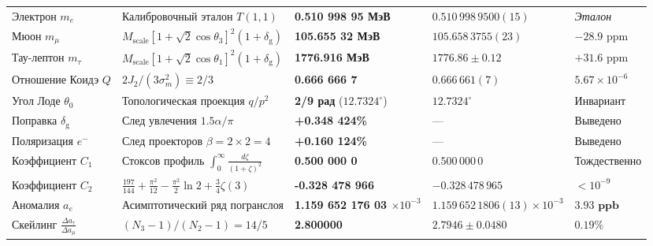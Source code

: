 \documentclass[11pt,a4paper]{article}
\theoremstyle{definition}
\theoremstyle{remark}
\begin{document}
\begin{xltabular}{\textwidth}{>{\raggedright\arraybackslash}p{3.2cm} X >{\centering\arraybackslash}p{2.7cm} >{\centering\arraybackslash}p{3.0cm} >{\raggedleft\arraybackslash}p{2.1cm}}
 \\
\midrule
Электрон $m_e$ & Калибровочный эталон $T(1,1)$ & \textbf{0.510 998 95 МэВ} & $0.510\,998\,9500(15)$ & \textit{Эталон} \\
Мюон $m_\mu$ & $M_{\mathrm{scale}} [1+\sqrt{2}\cos\theta_3]^2 (1+\delta_{\mathrm{g}})$ & \textbf{105.655 32 МэВ} & $105.658\,3755(23)$ & $-28.9\text{ ppm}$ \\
Тау-лептон $m_\tau$ & $M_{\mathrm{scale}} [1+\sqrt{2}\cos\theta_1]^2 (1+\delta_{\mathrm{g}})$ & \textbf{1776.916 МэВ} & $1776.86 \pm 0.12$ & $+31.6\text{ ppm}$ \\
Отношение Коидэ $Q$ & $2 J_2 / (3 \sigma_m^2) \equiv 2/3$ & \textbf{0.666 666 7} & $0.666\,661(7)$ & $5.67 \times 10^{-6}$ \\
Угол Лоде $\theta_0$ & Топологическая проекция $q/p^2$ & \textbf{2/9 рад} ($12.7324^\circ$) & $12.7324^\circ$ & Инвариант \\
Поправка $\delta_{\mathrm{g}}$ & След увлечения $1.5\alpha/\pi$ & \textbf{+0.348 424\%} & --- & Выведено \\
Поляризация $e^-$ & След проекторов $\beta = 2 \times 2 = 4$ & \textbf{+0.160 124\%} & --- & Выведено \\
Коэффициент $C_1$ & Стоксов профиль $\int_0^\infty \frac{d\zeta}{(1+\zeta)^2}$ & \textbf{0.500 000 0} & $0.500\,000\,0$ & Тождественно \\
Коэффициент $C_2$ & $\frac{197}{144} + \frac{\pi^2}{12} - \frac{\pi^2}{2}\ln 2 + \frac{3}{4}\zeta(3)$ & \textbf{-0.328 478 966} & $-0.328\,478\,965$ & $< 10^{-9}$ \\
Аномалия $a_e$ & Асимптотический ряд погранслоя & \textbf{1.159 652 176 03 $\times 10^{-3}$} & $1.159\,652\,1806(13)\times 10^{-3}$ & $\mathbf{3.93\text{ ppb}}$ \\
Скейлинг $\frac{\Delta a_\tau}{\Delta a_\mu}$ & $(N_3 - 1)/(N_2 - 1) = 14/5$ & \textbf{2.800000} & $2.7946 \pm 0.0480$ & $0.19\%$ \\
\midrule


\end{xltabular}
\end{document}
